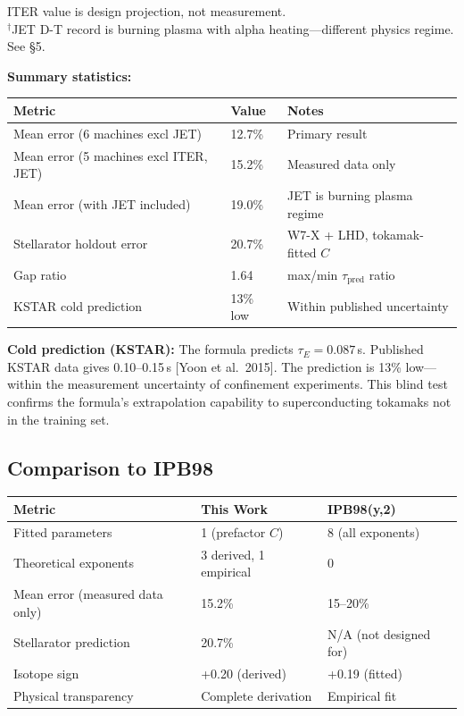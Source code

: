 \documentclass[11pt,letterpaper]{article}
\newcommand{\tauE}{\tau_E}
\begin{document}
\noindent *ITER value is design projection, not measurement.\\
$^\dagger$JET D-T record is burning plasma with alpha heating---different physics regime. See \S5.

\vspace{0.5em}
\textbf{Summary statistics:}

\begin{center}
\begin{tabular}{lll}
\toprule
\textbf{Metric} & \textbf{Value} & \textbf{Notes} \\
\midrule
Mean error (6 machines excl JET) & 12.7\% & Primary result \\
Mean error (5 machines excl ITER, JET) & 15.2\% & Measured data only \\
Mean error (with JET included) & 19.0\% & JET is burning plasma regime \\
Stellarator holdout error & 20.7\% & W7-X + LHD, tokamak-fitted $C$ \\
Gap ratio & 1.64 & max/min $\tau_{\text{pred}}$ ratio \\
KSTAR cold prediction & 13\% low & Within published uncertainty \\
\bottomrule
\end{tabular}
\end{center}

\vspace{0.3em}
\textbf{Cold prediction (KSTAR):} The formula predicts $\tauE = 0.087$\,s. Published KSTAR data gives 0.10--0.15\,s [Yoon et al.\ 2015]. The prediction is 13\% low---within the measurement uncertainty of confinement experiments. This blind test confirms the formula's extrapolation capability to superconducting tokamaks not in the training set.

\subsection{Comparison to IPB98}

\begin{center}
\begin{tabular}{lll}
\toprule
\textbf{Metric} & \textbf{This Work} & \textbf{IPB98(y,2)} \\
\midrule
Fitted parameters & 1 (prefactor $C$) & 8 (all exponents) \\
Theoretical exponents & 3 derived, 1 empirical & 0 \\
Mean error (measured data only) & 15.2\% & 15--20\% \\
Stellarator prediction & 20.7\% & N/A (not designed for) \\
Isotope sign & +0.20 (derived) & +0.19 (fitted) \\
Physical transparency & Complete derivation & Empirical fit \\
\bottomrule
\end{tabular}
\end{center}
\end{document}
